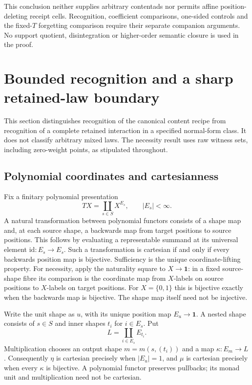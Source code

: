 \documentclass[11pt,a4paper]{article}
\theoremstyle{definition}
\newcommand{\id}{\mathrm{id}}
\newcommand{\one}{\mathbf 1}
\begin{document}
This conclusion neither supplies arbitrary contentads nor permits affine
position-deleting receipt cells. Recognition, coefficient comparisons,
one-sided controls and the fixed-$T$ forgetting comparison require their
separate companion arguments. No support quotient, disintegration or
higher-order semantic closure is used in the proof.

\section{Bounded recognition and a sharp retained-law boundary}\label{rb:section}

This section distinguishes recognition of the canonical content recipe from
recognition of a complete retained interaction in a specified normal-form
class. It does not classify arbitrary mixed laws. The necessity result uses
raw witness sets, including zero-weight points, as stipulated throughout.

\subsection{Polynomial coordinates and cartesianness}\label{rb:coordinates}

Fix a finitary polynomial presentation
\[
 TX=\coprod_{s\in S}X^{E_s},\qquad |E_s|<\infty.
\]
A natural transformation between polynomial functors consists of a shape
map and, at each source shape, a backwards map from target positions to
source positions. This follows by evaluating a representable summand at
its universal element $\id:E_s\to E_s$. Such a transformation is cartesian
if and only if every backwards position map is bijective. Sufficiency is
the unique coordinate-lifting property. For necessity, apply the naturality
square to $X\to\one$: in a fixed source-shape fibre its comparison is the
coordinate map from $X$-labels on source positions to $X$-labels on target
positions. For $X=\{0,1\}$ this is bijective exactly when the backwards map
is bijective. The shape map itself need not be injective.

Write the unit shape as $u$, with its unique position map $E_u\to\one$.
A nested shape consists of $s\in S$ and inner shapes $t_i$ for $i\in E_s$.
Put
\[
 L=\coprod_{i\in E_s}E_{t_i}.
\]
Multiplication chooses an output shape $m=m(s,(t_i))$ and a map
$\kappa:E_m\to L$. Consequently $\eta$ is cartesian precisely when
$|E_u|=1$, and $\mu$ is cartesian precisely when every $\kappa$ is bijective.
A polynomial functor preserves pullbacks; its monad unit and multiplication
need not be cartesian.
\end{document}
